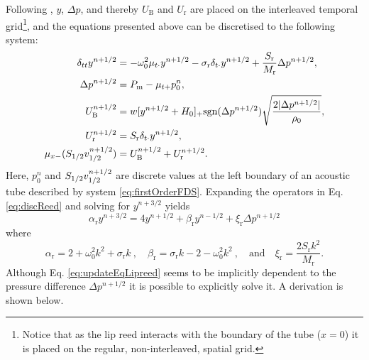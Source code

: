 Following \cite{Harrison2018}, $y$, $\Delta p$, and thereby $U_\text{B}$ and $U_\text{r}$ are placed on the interleaved temporal grid\footnote{Notice that as the lip reed interacts with the boundary of the tube ($x=0$) it is placed on the regular, non-interleaved, spatial grid.}, and the equations presented above can be discretised to the following system:
\begin{subequations}\label{eq:discreteLipSystem}
    \begin{align}
        \delta_{tt}y^{n+1/2} &= -\omega_0^2\mu_{t\cdot}y^{n+1/2}-\sigma_\text{r}\delta_{t\cdot}y^{n+1/2} + \frac{S_\text{r}}{M_{\text{r}}}\Delta p^{n+1/2},\label{eq:discReed}\\
        \Delta p^{n+1/2} &= P_\text{m} - \mu_{t+}p_0^n,\label{eq:pDiff}\\
        U_\text{B}^{n+1/2} &= w[y^{n+1/2}+H_0]_+\text{sgn}(\Delta p^{n+1/2})\sqrt{\frac{2|\Delta p^{n+1/2}|}{\rho_0}},\label{eq:bernoulli}\\
        U_\text{r}^{n+1/2} &= S_\text{r}\delta_{t\cdot}y^{n+1/2},\label{eq:Ur}\\
        \mu_{x-}(S_{1/2}v_{1/2}^{n+1/2}) &= U_\text{B}^{n+1/2} + U_\text{r}^{n+1/2}.\label{eq:UbUr}
    \end{align}
\end{subequations}
Here, $p_0^n$ and $S_{1/2}v_{1/2}^{n+1/2}$ are discrete values at the left boundary of an acoustic tube described by system \eqref{eq:firstOrderFDS}. Expanding the operators in Eq. \eqref{eq:discReed} and solving for $y^{n+3/2}$ yields
\begin{equation}\label{eq:updateEqLipreed}
    \alpha_\text{r}y^{n+3/2} = 4y^{n+1/2} + \beta_\text{r}y^{n-1/2} + \xi_\text{r}\Delta p^{n+1/2}
\end{equation}
where
\begin{equation}
    \alpha_\text{r} = 2 + \omega_0^2k^2 + \sigma_\text{r} k\ , \quad \beta_\text{r} =  \sigma_\text{r} k - 2 - \omega_0^2 k^2\ , \quad \text{and} \quad \xi_\text{r} = \frac{2 S_\text{r}k^2}{M_\text{r}}.
\end{equation}
Although Eq. \eqref{eq:updateEqLipreed} seems to be implicitly dependent to the pressure difference $\Delta p^{n+1/2}$ it is possible to explicitly solve it. A derivation is shown below.

